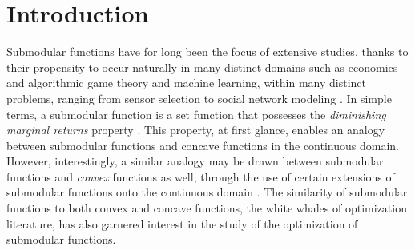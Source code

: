 \documentclass[letter,11pt]{article}
\begin{document}
\section{Introduction}\label{sec:intro}
Submodular functions have for long been the focus of extensive studies\cite{edmonds2003submodular, fujishige2005submodular, iyer2013submodular, krause2014submodular}, thanks to their propensity to occur naturally in many distinct domains such as economics and algorithmic game theory \cite{cardinality, revenue, gametheory} and machine learning\cite{MLRef1,MLRef2,MLRef3,MLRef4,MLRef5,MLRef6,MLRef7,MLRef8,MLRef9,MLRef10}, within many distinct problems, ranging from sensor selection \cite{RSOS, krause2014submodular, greedysensor, krausenearoptimal} to social network modeling \cite{Mossel2007}. In simple terms, a submodular function is a set function that possesses the \textit{diminishing marginal returns} property \cite{nemhauser1978analysis}. This property, at first glance, enables an analogy between submodular functions and concave functions in the continuous domain. However, interestingly, a similar analogy may be drawn between submodular functions and \textit{convex} functions as well, through the use of certain extensions of submodular functions onto the continuous domain \cite{Lovasz1983, krause2014submodular}. The similarity of submodular functions to both convex and concave functions, the white whales of optimization literature, has also garnered interest in the study of the optimization of submodular functions.



\end{document}
